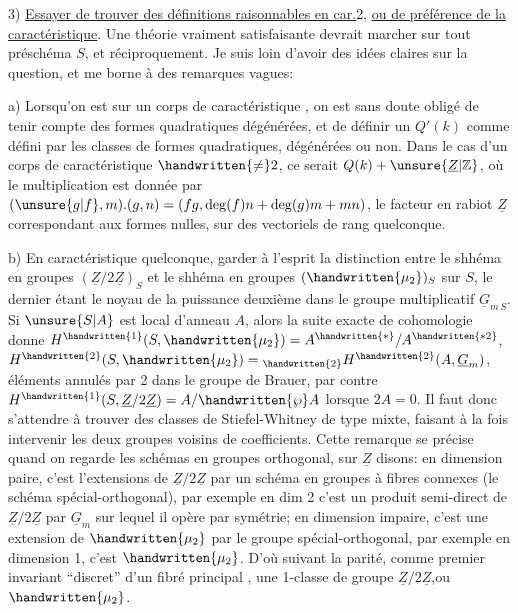 3) \uline{Essayer de trouver des définitions raisonnables en car.}2, \uline{ou de préférence  de la caractéristique}. Une théorie vraiment satisfaisante devrait marcher sur tout préschéma $S$, et réciproquement. Je suis loin d'avoir des idées claires sur la question, et me borne à des remarques vagues:

a) Lorsqu'on est sur un corps de caractéristique , on est sans doute obligé de tenir compte des formes quadratiques dégénérées, et de définir un  $Q'(k)$ comme défini par les classes de formes quadratiques, dégénérées ou non. \handwritten{[}Dans le cas d'un corps de  caractéristique $\handwritten{\ne}2$, ce serait $Q(k)+\unsure{\underline{Z}|\mathbb{Z}}$, où le  multiplication est donnée par $(\unsure{g|f},m).(g,n)=(fg,\deg(f)n+\deg(g)m+mn)$, le facteur en rabiot $\underline{Z}$ correspondant aux formes nulles, sur des vectoriels de rang quelconque\handwritten{]}.

b) En caractéristique quelconque, garder à l'esprit la distinction entre le shhéma en groupes $(\underline{Z}/2\underline{Z})_S$ et le shhéma en groupes $(\handwritten{\mu_2})_S$ sur $S$, le dernier étant le noyau de la puissance deuxième dans le groupe multiplicatif $\underline{G}_{m\,S}$. Si $\unsure{S|A}$ est local d'anneau $A$, alors la suite exacte de cohomologie donne $H^{\handwritten{1}}(S,\handwritten{\mu_2})=A^{\handwritten{*}}/A^{\handwritten{*2}}$, $H^{\handwritten{2}}(S,\handwritten{\mu_2})={}_{\handwritten{2}}H^{\handwritten{2}}(A,\underline{G}_m)$, éléments annulés par 2 dans le groupe de Brauer, par contre $H^{\handwritten{1}}(S,\underline{Z}/2\underline{Z})=A/\handwritten{\wp}A$ lorsque $2A=0$. Il faut donc s'attendre à trouver des classes de Stiefel-Whitney de type mixte, faisant à la fois intervenir les deux groupes voisins de coefficients. Cette remarque se précise quand on regarde les schémas en groupes orthogonal, sur $\underline{Z}$ disons: en dimension paire, c'est l'extensions de $\underline{Z}/2\underline{Z}$ par un schéma en groupes à fibres connexes (le schéma spécial-orthogonal), par exemple en dim 2 c'est  un produit semi-direct de $\underline{Z}/2\underline{Z}$ par $\underline{G}_m$ sur lequel il opère par symétrie; en dimension impaire, c'est une extension de $\handwritten{\mu_2}$ par le groupe spécial-orthogonal, par exemple en dimension 1, c'est $\handwritten{\mu_2}$. D'où suivant la parité, comme premier invariant ``discret'' d'un fibré principal , une 1-classe de groupe $\underline{Z}/2\underline{Z}$,ou $\handwritten{\mu_2}$.

